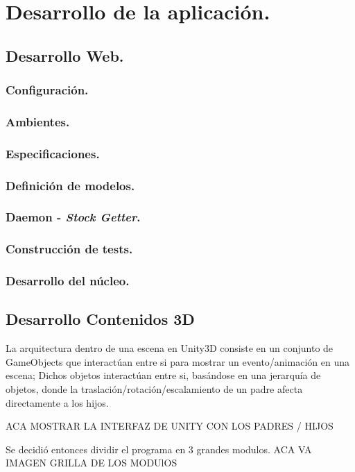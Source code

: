\chapter{Desarrollo de la aplicación.}

\section{Desarrollo Web.}

\subsection{Configuración.}
\subsection{Ambientes.}
\subsection{Especificaciones.}
\subsection{Definición de modelos.}
\subsection{Daemon - \emph{Stock Getter}.}
\subsection{Construcción de tests.}
\subsection{Desarrollo del núcleo.}


\section{Desarrollo Contenidos 3D}
La arquitectura dentro de una escena en Unity3D consiste en un conjunto de GameObjects que interactúan entre si para mostrar un evento/animación en una escena; Dichos objetos interactúan entre si, basándose en una jerarquía de objetos, donde la traslación/rotación/escalamiento de un padre afecta directamente a los hijos.

ACA MOSTRAR LA INTERFAZ DE UNITY CON LOS PADRES / HIJOS

Se decidió entonces dividir el programa en 3 grandes modulos.
ACA VA IMAGEN GRILLA DE LOS MODUlOS

